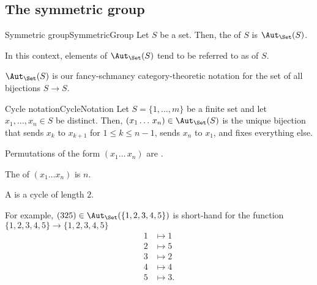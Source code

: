 \subsection{The symmetric group}

\begin{dfn}{Symmetric group}{SymmetricGroup}
	Let $S$ be a set.  Then, the  of $S$ is $\Aut _{\Set}(S)$.
	\begin{rmk}
		In this context, elements of $\Aut _{\Set}(S)$ tend to be referred to as  of $S$.
	\end{rmk}
	\begin{rmk}
		$\Aut _{\Set}(S)$ is our fancy-schmancy category-theoretic notation for the set of all bijections $S\rightarrow S$.
	\end{rmk}
\end{dfn}
\begin{dfn}{Cycle notation}{CycleNotation}
	Let $S=\{ 1,\ldots ,m\}$ be a finite set and let $x_1,\ldots ,x_n\in S$ be distinct.  Then, $(x_1\ldots \, x_n)\in \Aut _{\Set}(S)$ is the unique bijection that sends $x_k$ to $x_{k+1}$ for $1\leq k\leq n-1$, sends $x_n$ to $x_1$, and fixes everything else.
	\begin{rmk}
		Permutations of the form $(x_1\ldots \, x_n)$ are \index{Cycle}.
	\end{rmk}
	\begin{rmk}
		The  of $(x_1\ldots x_n)$ is $n$.
	\end{rmk}
	\begin{rmk}
		A  is a cycle of length $2$.
	\end{rmk}
	\begin{rmk}
		For example, $(325)\in \Aut _{\Set}(\{ 1,2,3,4,5\} )$ is short-hand for the function $\{ 1,2,3,4,5\} \rightarrow \{ 1,2,3,4,5\}$
		\begin{subequations}
			\begin{align}
				1 & \mapsto 1 \\
				2 & \mapsto 5 \\
				3 & \mapsto 2 \\
				4 & \mapsto 4 \\
				5 & \mapsto 3.
			\end{align}
		\end{subequations}
	\end{rmk}
\end{dfn}
